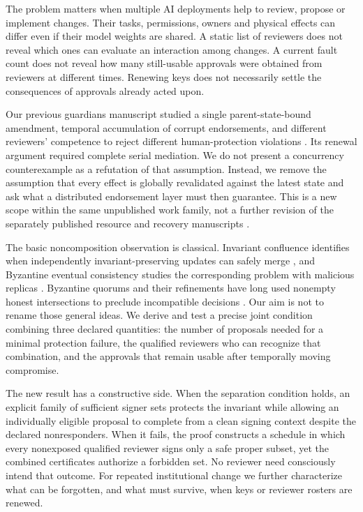 \documentclass[11pt,a4paper]{article}
\theoremstyle{definition}\newtheorem{definition}{Definition}
\begin{document}
The problem matters when multiple AI deployments help to review, propose or implement changes. Their tasks, permissions, owners and physical effects can differ even if their model weights are shared. A static list of reviewers does not reveal which ones can evaluate an interaction among changes. A current fault count does not reveal how many still-usable approvals were obtained from reviewers at different times. Renewing keys does not necessarily settle the consequences of approvals already acted upon.

Our previous guardians manuscript studied a single parent-state-bound amendment, temporal accumulation of corrupt endorsements, and different reviewers' competence to reject different human-protection violations \cite{eac2}. Its renewal argument required complete serial mediation. We do not present a concurrency counterexample as a refutation of that assumption. Instead, we remove the assumption that every effect is globally revalidated against the latest state and ask what a distributed endorsement layer must then guarantee. This is a new scope within the same unpublished work family, not a further revision of the separately published resource and recovery manuscripts \cite{pr6,rac13}.

The basic noncomposition observation is classical. Invariant confluence identifies when independently invariant-preserving updates can safely merge \cite{bailis}, and Byzantine eventual consistency studies the corresponding problem with malicious replicas \cite{bec}. Byzantine quorums and their refinements have long used nonempty honest intersections to preclude incompatible decisions \cite{malkhi,fast}. Our aim is not to rename those general ideas. We derive and test a precise joint condition combining three declared quantities: the number of proposals needed for a minimal protection failure, the qualified reviewers who can recognize that combination, and the approvals that remain usable after temporally moving compromise.

The new result has a constructive side. When the separation condition holds, an explicit family of sufficient signer sets protects the invariant while allowing an individually eligible proposal to complete from a clean signing context despite the declared nonresponders. When it fails, the proof constructs a schedule in which every nonexposed qualified reviewer signs only a safe proper subset, yet the combined certificates authorize a forbidden set. No reviewer need consciously intend that outcome. For repeated institutional change we further characterize what can be forgotten, and what must survive, when keys or reviewer rosters are renewed.
\end{document}
